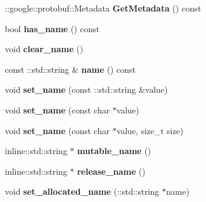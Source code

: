 \begin{DoxyCompactItemize}
\item 
\hypertarget{classproto_1_1_character_a131cbcdb689033b8696fce65d0b890c0}{}\+::google\+::protobuf\+::\+Metadata {\bfseries Get\+Metadata} () const \label{classproto_1_1_character_a131cbcdb689033b8696fce65d0b890c0}

\item 
\hypertarget{classproto_1_1_character_a81f2370d98998e7ad54c2df56fd2e7a1}{}bool {\bfseries has\+\_\+name} () const \label{classproto_1_1_character_a81f2370d98998e7ad54c2df56fd2e7a1}

\item 
\hypertarget{classproto_1_1_character_a0104106d7a1721d43d7e94b2e88b05a0}{}void {\bfseries clear\+\_\+name} ()\label{classproto_1_1_character_a0104106d7a1721d43d7e94b2e88b05a0}

\item 
\hypertarget{classproto_1_1_character_a2fb69b14ccc7b6a856f6d3a98d2b7261}{}const \+::std\+::string \& {\bfseries name} () const \label{classproto_1_1_character_a2fb69b14ccc7b6a856f6d3a98d2b7261}

\item 
\hypertarget{classproto_1_1_character_a7d0f6be8e73483c4aac1e5a1a08b871d}{}void {\bfseries set\+\_\+name} (const \+::std\+::string \&value)\label{classproto_1_1_character_a7d0f6be8e73483c4aac1e5a1a08b871d}

\item 
\hypertarget{classproto_1_1_character_af1498f77a643ce021f654d744ef40bf6}{}void {\bfseries set\+\_\+name} (const char $\ast$value)\label{classproto_1_1_character_af1498f77a643ce021f654d744ef40bf6}

\item 
\hypertarget{classproto_1_1_character_acfedcef5579d06f0786b796e6c48fa1d}{}void {\bfseries set\+\_\+name} (const char $\ast$value, size\+\_\+t size)\label{classproto_1_1_character_acfedcef5579d06f0786b796e6c48fa1d}

\item 
\hypertarget{classproto_1_1_character_ac829c93bde83f8f42cd1ba8d365caef3}{}inline\+::std\+::string $\ast$ {\bfseries mutable\+\_\+name} ()\label{classproto_1_1_character_ac829c93bde83f8f42cd1ba8d365caef3}

\item 
\hypertarget{classproto_1_1_character_a9d973d4b710de4c6ab00cb6b4c754083}{}inline\+::std\+::string $\ast$ {\bfseries release\+\_\+name} ()\label{classproto_1_1_character_a9d973d4b710de4c6ab00cb6b4c754083}

\item 
\hypertarget{classproto_1_1_character_a02ef1f00b4c9f65af29605911839db17}{}void {\bfseries set\+\_\+allocated\+\_\+name} (\+::std\+::string $\ast$name)\label{classproto_1_1_character_a02ef1f00b4c9f65af29605911839db17}


\end{DoxyCompactItemize}
